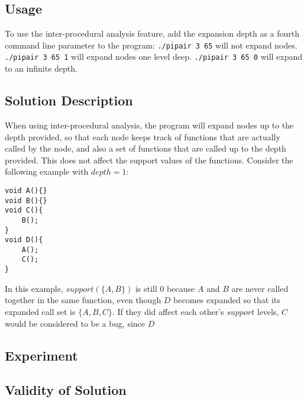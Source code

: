 \documentclass[10pt,a4paper]{article}
\author{Patrick White}
\begin{document}
\subsection{Usage}
To use the inter-procedural analysis feature, add the expansion depth as a fourth command line parameter to the program: \texttt{./pipair 3 65} will not expand nodes. \texttt{./pipair 3 65 1} will expand nodes one level deep. \texttt{./pipair 3 65 0} will expand to an infinite depth.
\subsection{Solution Description}
When using inter-procedural analysis, the program will expand nodes up to the depth provided, so that each node keeps track of functions that are actually called by the node, and also a set of functions that are called up to the depth provided. This does not affect the support values of the functions. Consider the following example with $depth=1$:
\begin{verbatim}
void A(){}
void B(){}
void C(){
	B();
}
void D(){
	A();
	C();
}
\end{verbatim}
In this example, $support(\{A,B\})$ is still $0$ because $A$ and $B$ are never called together in the same function, even though $D$ becomes expanded so that its expanded call set is $\{A,B,C\}$. If they did affect each other's $support$ levels, $C$ would be considered to be a bug, since $D$
\subsection{Experiment}
\subsection{Validity of Solution}
\end{document}
